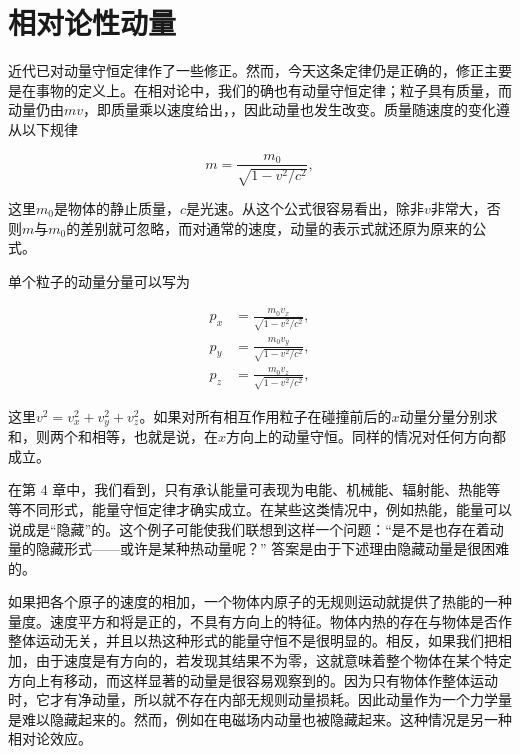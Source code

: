\documentclass[12pt,oneside]{book}
\begin{document}
\section{相对论性动量}
近代已对动量守恒定律作了一些修正。然而，今天这条定律仍是正确的，修正主要是在事物的定义上。在相对论中，我们的确也有动量守恒定律；粒子具有质量，而动量仍由$mv$，即质量乘以速度给出，，因此动量也发生改变。质量随速度的变化遵从以下规律

\begin{equation}
\label{Eq:I:10:7}
m=\frac{m_0}{\sqrt{1-v^2/c^2}},
\end{equation}

这里$m_0$是物体的静止质量，$c$是光速。从这个公式很容易看出，除非$v$非常大，否则$m$与$m_0$的差别就可忽略，而对通常的速度，动量的表示式就还原为原来的公式。

单个粒子的动量分量可以写为

\begin{equation}
\begin{aligned}
p_x&=\frac{m_0v_x}{\sqrt{1-v^2/c^2}},\\[1ex]
p_y&=\frac{m_0v_y}{\sqrt{1-v^2/c^2}},\\[1ex]
p_z&=\frac{m_0v_z}{\sqrt{1-v^2/c^2}},
\end{aligned}
\label{Eq:I:10:8}
\end{equation}

这里$v^2=v_x^2+v_y^2+v_z^2$。如果对所有相互作用粒子在碰撞前后的$x$动量分量分别求和，则两个和相等，也就是说，在$x$方向上的动量守恒。同样的情况对任何方向都成立。

在第 4 章中，我们看到，只有承认能量可表现为电能、机械能、辐射能、热能等等不同形式，能量守恒定律才确实成立。在某些这类情况中，例如热能，能量可以说成是“隐藏”的。这个例子可能使我们联想到这样一个问题：“是不是也存在着动量的隐藏形式——或许是某种热动量呢？” 答案是由于下述理由隐藏动量是很困难的。

如果把各个原子的速度的相加，一个物体内原子的无规则运动就提供了热能的一种量度。速度平方和将是正的，不具有方向上的特征。物体内热的存在与物体是否作整体运动无关，并且以热这种形式的能量守恒不是很明显的。相反，如果我们把相加，由于速度是有方向的，若发现其结果不为零，这就意味着整个物体在某个特定方向上有移动，而这样显著的动量是很容易观察到的。因为只有物体作整体运动时，它才有净动量，所以就不存在内部无规则动量损耗。因此动量作为一个力学量是难以隐藏起来的。然而，例如在电磁场内动量也被隐藏起来。这种情况是另一种相对论效应。
\end{document}
